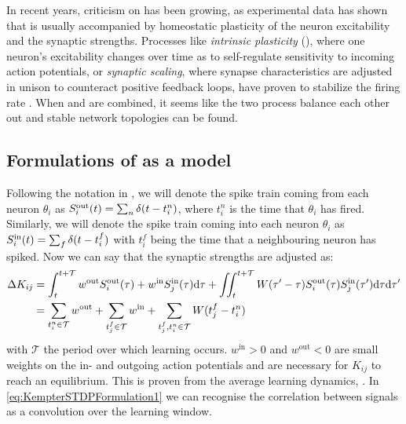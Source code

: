 In recent years, criticism on \STDP has been growing, as experimental data has shown that \STDP is usually accompanied by homeostatic plasticity of the neuron excitability and the synaptic strengths. Processes like \textsl{intrinsic plasticity} (\IP), where one neuron's excitability changes over time as to self-regulate sensitivity to incoming action potentials, or \textsl{synaptic scaling}, where synapse characteristics are adjusted in unison to counteract positive feedback loops, have proven to stabilize the firing rate \cite{ChrolCannon2014, Kirkwood2019}. When \STDP and \IP are combined, it seems like the two process balance each other out and stable network topologies can be found.


\subsection{Formulations of \STDP as a model}
Following the notation in \cite{Kempter1999}, we will denote the spike train coming from each neuron $\theta_i$ as $S_i^{\rm out}(t) = \sum_{n} \delta (t-t_{i}^{n})$, where $t_{i}^{n}$ is the time that $\theta_i$ has fired. Similarly, we will denote the spike train coming into each neuron $\theta_i$ as $S_i^{\rm in}(t) = \sum_{f} \delta (t-t_{i}^{f})$ with $t_{i}^{f}$ being the time that a neighbouring neuron has spiked. Now we can say that the synaptic strengths are adjusted as:
\begin{align}
\Delta K_{ij} &= \int_{t}^{t+\mathcal{T}} w^{\rm{out}} S_i^{\rm out}(\tau) + w^{\rm{in}} S_{j}^{\rm {in}}(\tau) \mathrm{d}\tau
+ \iint_{t}^{t+\mathcal{T}} W( \tau^\prime - \tau) S_{i}^{\rm out}(\tau) S_{j}^{\rm in}( \tau^\prime) \mathrm{d} \tau \mathrm{d} \tau^\prime
\label{eq:KempterSTDPFormulation1} \\
&= \sum_{t_i^{n}\in \mathcal{T}} w^{\mathrm{out}} + \sum_{t_{j}^{f} \in \mathcal{T}} w^{\mathrm{in}} + \sum_{t_{j}^{f}, t_i^{n} \in \mathcal{T}} W (t_{j}^{f}-t_i^{n} ) \label{eq:KempterSTDPFormulation2}
\end{align}
with $\mathcal{T}$ the period over which learning occurs. $w^{\mathrm{in}} > 0$ and $w^{\mathrm{out}} < 0$ are small weights on the in- and outgoing action potentials and are necessary for $K_{ij}$ to reach an equilibrium. This is proven from the average learning dynamics, \cite{Kempter1999}. In \eqref{eq:KempterSTDPFormulation1} we can recognise the correlation between signals as a convolution over the learning window. \\

